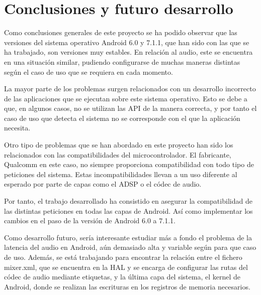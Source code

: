 \chapter{Conclusiones y futuro desarrollo}
Como conclusiones generales de este proyecto se ha podido observar que las versiones del sistema operativo Android 6.0 y 7.1.1, que han sido con las que se ha trabajado, son versiones muy estables. En relación al audio, este se encuentra en una situación similar, pudiendo configurarse de muchas maneras distintas según el caso de uso que se requiera en cada momento.

La mayor parte de los problemas surgen relacionados con un desarrollo incorrecto de las aplicaciones que se ejecutan sobre este sistema operativo. Esto se debe a que, en algunos casos, no se utilizan las \gls{API} de la manera correcta, y por tanto el caso de uso que detecta el sistema no se corresponde con el que la aplicación necesita.

Otro tipo de problemas que se han abordado en este proyecto han sido los relacionados con las compatibilidades del microcontrolador. El fabricante, Qualcomm en este caso, no siempre proporciona compatibilidad con todo tipo de peticiones del sistema. Estas incompatibilidades llevan a un uso diferente al esperado por parte de capas como el \gls{ADSP} o el códec de audio.

Por tanto, el trabajo desarrollado ha consistido en asegurar la compatibilidad de las distintas peticiones en todas las capas de Android. Así como implementar los cambios en el paso de la versión de Android 6.0 a 7.1.1.

Como desarrollo futuro, sería interesante estudiar más a fondo el problema de la latencia del audio en Android, aún demasiado alta y variable según para que caso de uso. Además, se está trabajando para encontrar la relación entre el fichero mixer.xml, que se encuentra en la \gls{HAL} y se encarga de configurar las rutas del códec de audio mediante etiquetas, y la última capa del sistema, el kernel de Android, donde se realizan las escrituras en los registros de memoria necesarios.



